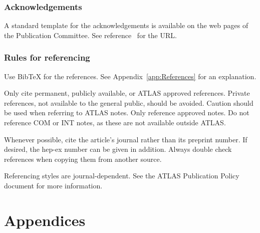 \documentclass[11pt,a4paper]{atlasnote}
\newcommand{\BibTeX}{{\sc Bib\TeX}}
\begin{document}
%
%
\section{Acknowledgements}

A standard template for the acknowledgements is available on the
web pages of the Publication Committee.
See reference~\cite{publication_policy} for the URL. 

%
%
\section{Rules for referencing}

Use \BibTeX{} for the references. See Appendix~\ref{app:References}
for an explanation.

Only cite permanent, publicly available, or ATLAS approved references.
Private references, not available to the general public, should be
avoided. Caution should be used when referring to ATLAS notes.
Only reference approved notes. Do not reference COM or INT notes,
as these are not available outside ATLAS.

Whenever possible, cite the article's journal rather than its
preprint number. If desired, the hep-ex number can be given in
addition. Always double check references when copying them from
another source.

Referencing styles are journal-dependent. See the ATLAS Publication
Policy document for more information.






\newpage
\appendix
\part*{Appendices}
\end{document}
